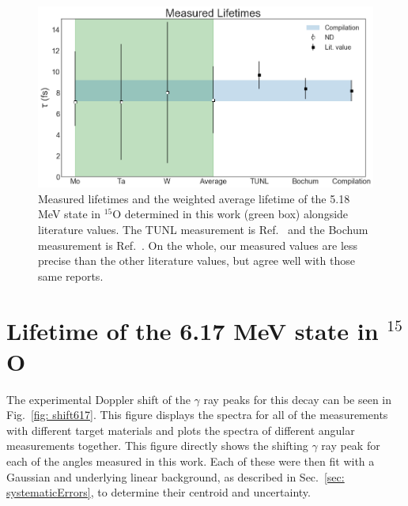 \begin{figure}
\centering
\includegraphics[width=\linewidth]{figures/lifetimes518.png}
\caption{Measured lifetimes and the weighted average lifetime of the 5.18 MeV state in $^{15}$O determined in this work (green box) alongside literature values. The TUNL measurement is Ref.\ \cite{Bertone2001} and the Bochum measurement is Ref.\ \cite{Schurmann2008}. On the whole, our measured values are less precise than the other literature values, but agree well with those same reports.}
\label{fig: lifetimes518}
\end{figure}



\section{Lifetime of the 6.17 MeV state in $^{15}$O}
\label{sec: lifetime617}


The experimental Doppler shift of the $\gamma$ ray peaks for this decay can be seen in Fig.\ \ref{fig: shift617}. This figure displays the spectra for all of the measurements with different target materials and plots the spectra of different angular measurements together. This figure directly shows the shifting $\gamma$ ray peak for each of the angles measured in this work. Each of these were then fit with a Gaussian and underlying linear background, as described in Sec.\ \ref{sec: systematicErrors}, to determine their centroid and uncertainty. 


